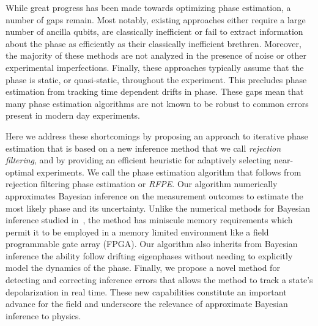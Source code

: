 \documentclass[aps,prl,amsmath,twocolumn,amssymb,superscriptaddress]{revtex4-1}
\begin{document}
While great progress has been made towards optimizing phase estimation, a number of gaps remain.  Most notably, existing approaches either require a large number of ancilla qubits, are classically inefficient or fail to extract information about the phase as efficiently as their classically inefficient brethren.  Moreover, the majority of these methods are not analyzed in the presence of noise or other experimental imperfections.  Finally, these approaches typically assume that the phase is static, or quasi-static, throughout the experiment.  This precludes phase estimation from tracking time dependent drifts in phase.  These gaps mean that many phase estimation algorithms are not known to be robust to common errors present in modern day experiments.


Here we address these shortcomings by proposing an approach to iterative phase estimation that is based on a new inference method that we call \emph{rejection filtering}, and by providing an efficient heuristic for adaptively selecting near-optimal experiments. We call the phase estimation algorithm that follows from rejection filtering phase estimation or \emph{RFPE}.  Our algorithm numerically approximates Bayesian inference on the measurement outcomes to estimate the most likely phase and its uncertainty.  Unlike the numerical methods for Bayesian inference studied in~\cite{granade_robust_2012, stenberg_efficient_2014}, the method has miniscule memory requirements which permit it to be employed in a memory limited environment like a field programmable gate array (FPGA).  Our algorithm also inherits from Bayesian inference the ability follow drifting eigenphases without needing to explicitly model the dynamics of the phase.  Finally, we propose a novel method for detecting and correcting inference errors that allows the method to track a state's depolarization in real time.  These new capabilities constitute an important advance for the field and underscore the relevance of approximate Bayesian inference to physics.
%
\end{document}
